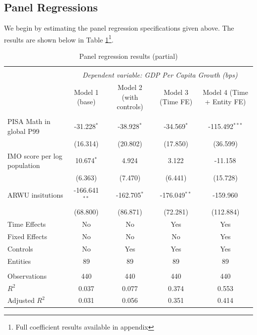 \documentclass[11pt]{article}
\begin{document}
\subsection{Panel Regressions}
We begin by estimating the panel regression specifications given above. The results are shown below in Table \ref{table:panel}\footnote{Full coefficient results available in appendix}.
\begin{table}[H] \centering
    \caption{Panel regression results (partial)}
    \label{table:panel}
    \resizebox{\linewidth}{!} {
        \begin{tabular}{@{\extracolsep{5pt}}lcccc}
            \\[-1.8ex]\hline
            \hline \\[-1.8ex]
            & \multicolumn{4}{c}{\textit{Dependent variable: GDP Per Capita Growth (bps)}} \
            \cr \cline{2-5}
            \\[-1.8ex] & \multicolumn{1}{c}{Model 1 (base)} & \multicolumn{1}{c}{Model 2 (with controls)} & \multicolumn{1}{c}{Model 3 (Time FE)} & \multicolumn{1}{c}{Model 4 (Time + Entity FE)}  \\
            \hline \\[-1.8ex]
             PISA Math in global P99 & -31.228$^{*}$ & -38.928$^{*}$ & -34.569$^{*}$ & -115.492$^{***}$ \\
            & (16.314) & (20.802) & (17.850) & (36.599) \\
             IMO score per log population & 10.674$^{*}$ & 4.924$^{}$ & 3.122$^{}$ & -11.158$^{}$ \\
            & (6.363) & (7.470) & (6.441) & (15.728) \\
             ARWU insitutions & -166.641$^{**}$ & -162.705$^{*}$ & -176.049$^{**}$ & -159.960$^{}$ \\
            & (68.800) & (86.871) & (72.281) & (112.884) \\
             Time Effects & No & No & Yes & Yes \\
             Fixed Effects & No & No & No & Yes \\
             Controls & No & Yes & Yes & Yes \\
             Entities & 89 & 89 & 89 & 89 \\
            \hline \\[-1.8ex]
             Observations & 440 & 440 & 440 & 440 \\
             $R^2$ & 0.037 & 0.077 & 0.374 & 0.553 \\
             Adjusted $R^2$ & 0.031 & 0.056 & 0.351 & 0.414 \\

\end{tabular}}
\end{table}
\end{document}
